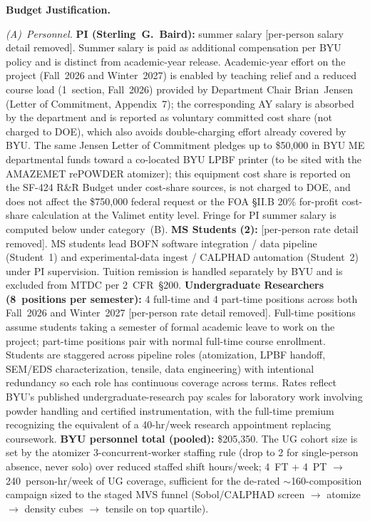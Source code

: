 \documentclass[11pt,letterpaper]{article}
\begin{document}
\textbf{Budget Justification.}

\textit{(A)~Personnel.}
\textbf{PI (Sterling~G.~Baird):} summer salary [per-person salary detail removed].  Summer salary
is paid as additional compensation per BYU policy and is distinct from
academic-year release.  Academic-year effort on the project (Fall~2026 and
Winter~2027) is enabled by teaching relief and a reduced course load
(1~section, Fall~2026) provided by Department Chair Brian~Jensen (Letter of
Commitment, Appendix~7); the corresponding AY salary is absorbed by the
department and is reported as voluntary committed cost share (not charged to
DOE), which also avoids double-charging effort already covered by BYU.  The
same Jensen Letter of Commitment pledges up to \$50{,}000 in BYU ME
departmental funds toward a co-located BYU LPBF printer (to be sited with the
AMAZEMET rePOWDER atomizer); this equipment cost share is reported on the
SF-424 R\&R Budget under cost-share sources, is not charged to DOE, and does
not affect the \$750,000 federal request or the FOA \S II.B 20\% for-profit
cost-share calculation at the Valimet entity level.
Fringe for PI summer salary is computed below under category~(B).
\textbf{MS Students (2):} [per-person rate detail removed].  MS students
lead BOFN software integration / data pipeline (Student~1) and
experimental-data ingest / CALPHAD automation (Student~2) under PI
supervision.  Tuition remission is handled separately by BYU and is
excluded from MTDC per 2~CFR~\S200.
\textbf{Undergraduate Researchers (8~positions per semester):} 4 full-time
and 4 part-time positions across both Fall~2026 and Winter~2027 [per-person rate detail removed].
Full-time positions assume students taking a semester of formal academic leave
to work on the project; part-time positions pair with normal full-time course
enrollment.  Students are staggered across pipeline roles
(atomization, LPBF handoff, SEM/EDS characterization, tensile, data engineering)
with intentional redundancy so each role has continuous coverage across
terms.  Rates reflect BYU's published undergraduate-research pay scales for
laboratory work involving powder handling and certified instrumentation,
with the full-time premium recognizing the equivalent of a 40-hr/week research
appointment replacing coursework.
\textbf{BYU personnel total (pooled):} \$205{,}350.  The
UG cohort size is set by the atomizer 3-concurrent-worker staffing rule
(drop to 2 for single-person absence, never solo) over reduced staffed shift
hours/week; 4~FT + 4~PT $\to$ 240~person-hr/week of UG coverage, sufficient
for the de-rated $\sim$160-composition campaign sized to the staged MVS
funnel (Sobol/CALPHAD screen $\to$ atomize $\to$ density cubes $\to$
tensile on top quartile).
\end{document}
